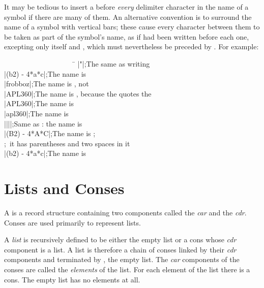 It may be tedious to insert a \cd{{\Xbackslash}} before \emph{every} delimiter
character in the name of a symbol if there are many of them.
An alternative convention is to surround the name of a symbol
with vertical bars; these cause every character between them to
be taken as part of the symbol's name, as if \cd{{\Xbackslash}} had been written
before each one, excepting only
\cd{|} itself and \cd{{\Xbackslash}}, which must nevertheless be preceded by \cd{{\Xbackslash}}.
For example:
\begin{lisp}
~~~~~~~~~~~~~~~~~~~~\=\kill
|"|\>;\textrm{The same as writing } \\
|(b{\Xcircumflex}2) - 4*a*c|\>;\textrm{The name is } \\
|frobboz|\>;\textrm{The name is , not } \\
|APL{\Xbackslash}360|\>;\textrm{The name is , because the \cd{{\Xbackslash}} quotes the } \\
|APL{\Xbackslash}{\Xbackslash}360|\>;\textrm{The name is } \\
|apl{\Xbackslash}{\Xbackslash}360|\>;\textrm{The name is } \\
|{\Xbackslash}|{\Xbackslash}||\>;\textrm{Same as \cd{{\Xbackslash}|{\Xbackslash}|}: the name is \cd{||}} \\
|(B{\Xcircumflex}2) - 4*A*C|\>;\textrm{The name is ;} \\
\>;~\textrm{it has parentheses and two spaces in it} \\
|(b{\Xcircumflex}2) - 4*a*c|\>;\textrm{The name is }
\end{lisp}

\section{Lists and Conses}

A  is a record structure containing two components
called the \emph{car} and the \emph{cdr}.  Conses are used primarily
to represent lists.

A \emph{list} is recursively defined to be either the empty list
or a cons whose \emph{cdr} component is a list.
A list is therefore a chain of conses linked by their \emph{cdr} components
and terminated by {\nil}, the empty list.  The \emph{car} components of the conses
are called the \emph{elements} of the list.  For each element of the list
there is a cons.  The empty list has no elements at all.

